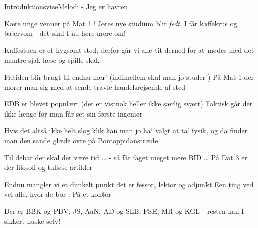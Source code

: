 \begin{sang}{Introduktionsvise}{Melodi - Jeg er havren}
\begin{vers}
Kære unge venner på Mat 1 !
Jeres nye studium blir {\em fedt},
I får kaffekrus og bajervom
- det skal I nu høre mere om!
\end{vers}
\begin{vers}
Kaffestuen er et hygsomt sted;
derfor går vi alle tit derned
for at mødes med det muntre sjak
læse og spille skak
\end{vers}
\begin{vers}
Fritiden blir brugt til endnu mer'
(indimellem skal man jo studer')
På Mat 1 der morer man sig med
at sende travle handelsrejsende af sted
\end{vers}
\begin{vers}
EDB er blevet populært
(det er vistnok heller ikke særlig svært)
Faktisk går der ikke længe før
man får set sin første ingeniør
\end{vers}
\vbox{}\vfill
\begin{vers}
Hvis det altså ikke helt slog klik
kan man jo ha` valgt at ta` fysik,
og da finder man den sande glæde
ovre på Pontoppidanstræde
\end{vers}
\begin{vers}
Til debat der skal der være tid \ldots
- så får faget meget mere BID \ldots
På Dat 3 er der filosofi
og talløse artikler
\end{vers}
\begin{vers}
Endnu mangler vi et dunkelt punkt
det er fessor, lektor og adjunkt
Een ting ved vel alle, hvor de bor :
På et kontor
\end{vers}
\begin{vers}
Der er BBK og PDV,
JS, AaN, AD og SLB,
PSE, MR og KGL
- resten kan I sikkert huske selv!
\end{vers}

\laps

\end{sang}